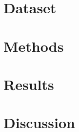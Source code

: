 \documentclass[pmlr]{jmlr_arxiv}%
\begin{document}
\section{Dataset}
\label{sec:Dataset}


\section{Methods}
\label{sec:Methods}




\section{Results}
%
\label{sec:Results}



%
%

\section{Discussion}
\label{sec:Discussion}







\appendix

\makeatletter
\let\c@table\c@figure %
\let\ftype@table\ftype@figure %
\makeatother

\setcounter{table}{0}
\setcounter{figure}{0}
\setcounter{algocf}{0}


\end{document}
